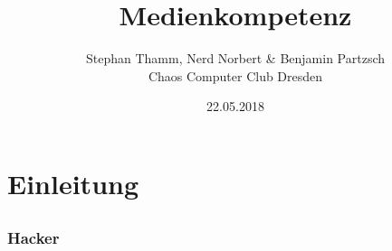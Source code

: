 \documentclass[12pt]{beamer}
\title{Medienkompetenz}
\author{\small Stephan Thamm, Nerd Norbert \& Benjamin Partzsch \\\large Chaos Computer Club Dresden}
\date{22.05.2018}
\begin{document}
\maketitle

\section*{Einleitung}
\subsection*{}


\begin{frame}
  \frametitle{Hacker}
  \begin{figure}

\end{figure}
\end{frame}
\end{document}
